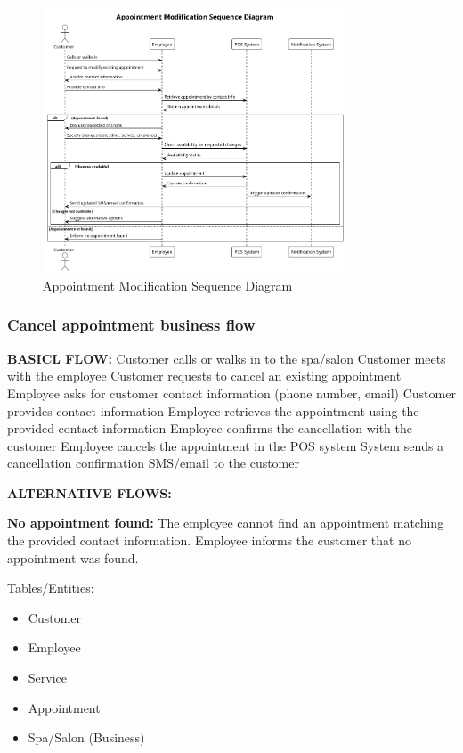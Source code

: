 \documentclass[]{VUMIFTemplateClass}
\begin{document}
\begin{figure}[H]
    \centering
    \includegraphics[width=0.8\textwidth]{images/diagrams/services/appointment_modification_sequence.png}
    \caption{Appointment Modification Sequence Diagram}
    \label{fig:appointment_modification_sequence}
\end{figure}

\subsubsection{Cancel appointment business flow}
\textbf{BASICL FLOW:}
Customer calls or walks in to the spa/salon
Customer meets with the employee
Customer requests to cancel an existing appointment
Employee asks for customer contact information (phone number, email)
Customer provides contact information
Employee retrieves the appointment using the provided contact information
Employee confirms the cancellation with the customer
Employee cancels the appointment in the POS system
System sends a cancellation confirmation SMS/email to the customer

\textbf{ALTERNATIVE FLOWS:}
\item \textbf{No appointment found: } The employee cannot find an appointment matching the provided contact information.
Employee informs the customer that no appointment was found.

Tables/Entities:
\begin{itemize}
    \setlength{\itemsep}{2pt}
    \setlength{\parskip}{0pt}
    \setlength{\parsep}{0pt}
    \item Customer
    \item Employee
    \item Service
    \item Appointment
    \item Spa/Salon (Business)
\end{itemize}
\end{document}

